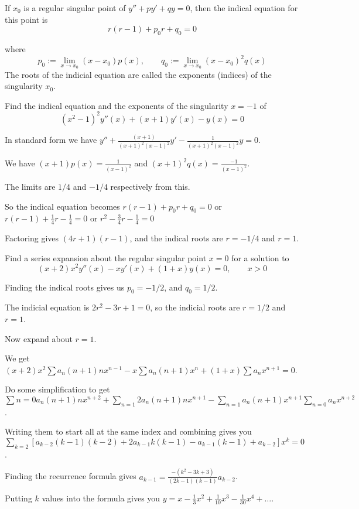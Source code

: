\documentclass[../diffeq.tex]{subfiles}
\begin{document}
\begin{definition}
    If $x_0$ is a regular singular point of $y''+py'+qy=0$, then the indical equation for this point is 
    \[ r(r-1)+p_0r+q_0=0\]

    where 
    \[ p_0 := \lim_{x\to x_0}(x-x_0)p(x), \qquad q_0 := \lim_{x\to x_0}(x-x_0)^2q(x) \]
    The roots of the indicial equation are called the exponents (indices) of the singularity $x_0$.
\end{definition}

\begin{example}
    Find the indical equation and the exponents of the singularity $x=-1$ of 
    \[ (x^2-1)^2y''(x)+(x+1)y'(x)-y(x)=0 \]

    In standard form we have $y''+\frac{(x+1)}{(x+1)^2(x-1)^2}y'-\frac{1}{(x+1)^2(x-1)^2}y=0$.

    We have $(x+1)p(x)=\frac{1}{(x-1)^2}$ and $(x+1)^2q(x)=\frac{-1}{(x-1)^2}$.

    The limits are $1/4$ and $-1/4$ respectively from this.

    So the indical equation becomes $r(r-1)+p_0r+q_0=0$ or $r(r-1)+\frac{1}{4}r-\frac{1}{4}=0$ or $r^2-\frac{3}{4}r-\frac{1}{4}=0$

    Factoring gives $(4r+1)(r-1)$, and the indical roots are $r=-1/4$ and $r=1$.
\end{example}

\begin{example}
    Find a series expansion about the regular singular point $x=0$ for a solution to 
    \[(x+2)x^2y''(x)-xy'(x)+(1+x)y(x)=0, \qquad x>0 \]

    Finding the indical roots gives us $p_0=-1/2$, and $q_0=1/2$.

    The indicial equation is $2r^2-3r+1=0$, so the indicial roots are $r=1/2$ and $r=1$.

    Now expand about $r=1$.

    We get $(x+2)x^2\sum a_n(n+1)nx^{n-1}-x\sum a_n(n+1)x^n+(1+x)\sum a_nx^{n+1}=0$.

    Do some simplification to get $\sum{n=0} a_n(n+1)nx^{n+2}+\sum_{n=1}2a_n(n+1)nx^{n+1}-\sum_{n=1}a_n(n+1)x^{n+1}\sum_{n=0} a_n x^{n+2}$.

    Writing them to start all at the same index and combining gives you $\sum_{k=2}[a_{k-2}(k-1)(k-2)+2a_{k-1}k(k-1)-a_{k-1}(k-1)+a_{k-2}]x^k=0$.

    Finding the recurrence formula gives $a_{k-1}=\frac{-(k^2-3k+3)}{(2k-1)(k-1)}a_{k-2}$.

    Putting $k$ values into the formula gives you $y=x-\frac{1}{3}x^2+\frac{1}{10}x^3-\frac{1}{30}x^4+\dots$.
\end{example}
\end{document}

